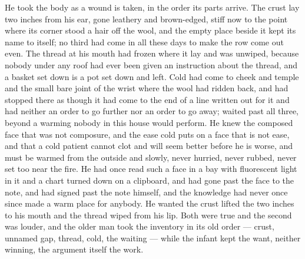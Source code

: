 He took the body as a wound is taken, in the order its parts arrive. The crust lay two inches from his ear, gone leathery and brown-edged, stiff now to the point where its corner stood a hair off the wool, and the empty place beside it kept its name to itself; no third had come in all these days to make the row come out even. The thread at his mouth had frozen where it lay and was unwiped, because nobody under any roof had ever been given an instruction about the thread, and a basket set down is a pot set down and left. Cold had come to cheek and temple and the small bare joint of the wrist where the wool had ridden back, and had stopped there as though it had come to the end of a line written out for it and had neither an order to go further nor an order to go away;  waited past all three, beyond a warming nobody in this house would perform. He knew the composed face that was not composure, and the ease cold puts on a face that is not ease, and that a cold patient cannot clot and will seem better before he is worse, and must be warmed from the outside and slowly, never hurried, never rubbed, never set too near the fire. He had once read such a face in a bay with fluorescent light in it and a chart turned down on a clipboard, and had gone past the face to the note, and had signed past the note himself, and the knowledge had never once since made a warm place for anybody. He wanted the crust lifted the two inches to his mouth and the thread wiped from his lip. Both were true and the second was louder, and the older man took the inventory in its old order --- crust, unnamed gap, thread, cold, the waiting --- while the infant kept the want, neither winning, the argument itself the work.

